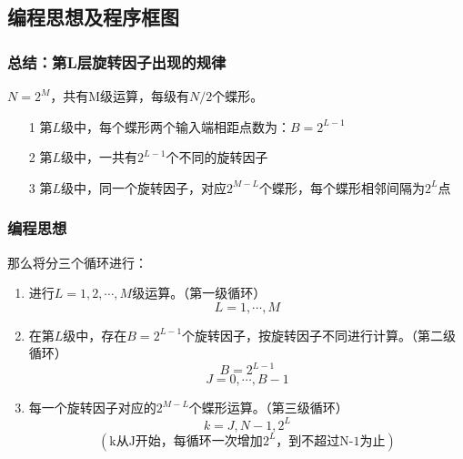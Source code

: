 \documentclass[notheorems,compress,mathserif,table]{beamer}
\begin{document}
\subsection{编程思想及程序框图}
\begin{frame}[shrink]\frametitle{总结：第L层旋转因子出现的规律}%
$N=2^M$，共有M级运算，每级有$N/2$个蝶形。
\begin{enumerate}
  \item [1] 第$L$级中，每个蝶形两个输入端相距点数为：$B=2^{L-1}$
  \item [2] 第$L$级中，一共有$2^{L-1}$个不同的旋转因子
  \item [3] 第$L$级中，同一个旋转因子，对应$2^{M-L}$个蝶形，每个蝶形相邻间隔为$2^L$点
\end{enumerate}
\end{frame}
\begin{frame}[shrink]\frametitle{编程思想}%
那么将分三个循环进行：
\begin{enumerate}
  \item 进行$L=1,2,\cdots,M$级运算。（第一级循环）
  $$L=1,\cdots,M$$
  \item 在第$L$级中，存在$B=2^{L-1}$个旋转因子，按旋转因子不同进行计算。（第二级循环）
  $$B=2^{L-1}$$
  $$J=0,\cdots,B-1$$
  \item 每一个旋转因子对应的$2^{M-L}$个蝶形运算。（第三级循环）
  $$k = J,N-1,2^L$$
  $$(\mbox{k从J开始，每循环一次增加$2^L$，到不超过N-1为止})$$
\end{enumerate}
\end{frame}
\end{document}
